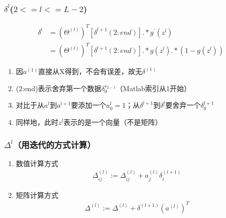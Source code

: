 

\subsubsection{$\delta^{l}$($2<=l<=L-2$)}
\begin{equation}\begin{aligned}
	\delta^{l} &= (\Theta^{(l)})^T [\delta^{l+1}(2:end)] .* g^{'}(z^{l}) \\
	&= (\Theta^{(l)})^T [\delta^{l+1}(2:end)] .* g(z^{l}) .* (1-g(z^{l}))
\end{aligned}\end{equation}
\begin{enumerate}
	\item 因$a^{(1)}$直接从X得到，不会有误差，故无$\delta^{(1)}$
	\item (2:end)表示舍弃第一个数据$\delta_0^{s_{L-1}}$（Matlab索引从1开始）
	\item 对比于从$a^{l}$到$a^{l+1}$要添加一个$a_0^{l}=1$；从$\delta^{l+1}$到$\delta^{l}$要舍弃一个$\delta_0^{l+1}$
	\item 同样地，此时$z^{l}$表示的是一个向量（不是矩阵）
\end{enumerate}

\subsubsection{$\Delta^{l}$（用迭代的方式计算）}
\begin{enumerate}
	\item 数值计算方式
	\begin{equation}\begin{aligned}
		\Delta_{ij}^{(l)} := \Delta_{ij}^{(l)} + a_j^{(l)} \delta_i^{(l+1)}
	\end{aligned}\end{equation}
	\item 矩阵计算方式
	\begin{equation}\begin{aligned}
		\Delta^{(l)} := \Delta^{(l)} + \delta^{(l+1)} (a^{(l)})^T
	\end{aligned}\end{equation}
\end{enumerate}

